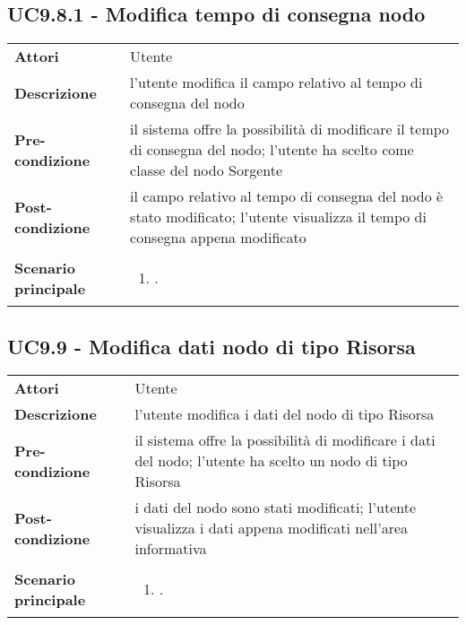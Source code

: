 \subsection{UC9.8.1 - Modifica tempo di consegna nodo} 
\label{sssec:UC9.8.1} 
\def\arraystretch{1.5}
\begin{tabularx}{\textwidth}{l|p{}}
	\rowcolor{I} \multicolumn{2}{c}{\color{white}\textbf{UC9.8.1 - Modifica tempo di consegna nodo}} \\
	\toprule
	\endhead
	\textbf{Attori} & Utente\\
	\textbf{Descrizione} & l'utente modifica il campo relativo al  tempo di consegna del nodo\\
	\textbf{Pre-condizione} & il sistema offre la possibilità di modificare il tempo di consegna del nodo; l'utente ha scelto come classe del nodo Sorgente\\
	\textbf{Post-condizione} & il campo relativo al tempo di consegna del nodo è stato modificato; l'utente visualizza il tempo di consegna appena modificato\\
	\textbf{Scenario principale} & \vspace{-1.2em}\begin{enumerate}[leftmargin=*,noitemsep,nosep]
		\item \nameref{sssec:UC9.8.1}.
	\end{enumerate}\\
	\bottomrule
\end{tabularx}
\subsection{UC9.9 - Modifica dati nodo di tipo Risorsa} 
\label{sssec:UC9.9} 
\def\arraystretch{1.5}
\begin{tabularx}{\textwidth}{l|p{}}
	\rowcolor{I} \multicolumn{2}{c}{\color{white}\textbf{UC9.9 - Modifica dati nodo di tipo Risorsa}} \\
	\toprule
	\endhead
	\textbf{Attori} & Utente\\
	\textbf{Descrizione} & l'utente modifica i dati del nodo di tipo Risorsa\\
	\textbf{Pre-condizione} & il sistema offre la possibilità di modificare i dati del nodo; l'utente ha scelto un nodo di tipo Risorsa\\
	\textbf{Post-condizione} & i dati del nodo sono stati modificati; l'utente visualizza i dati appena modificati nell'area informativa\\
	\textbf{Scenario principale} & \vspace{-1.2em}\begin{enumerate}[leftmargin=*,noitemsep,nosep]
		\item \nameref{sssec:UC9.9}.
	\end{enumerate}\\
	\bottomrule
\end{tabularx}

